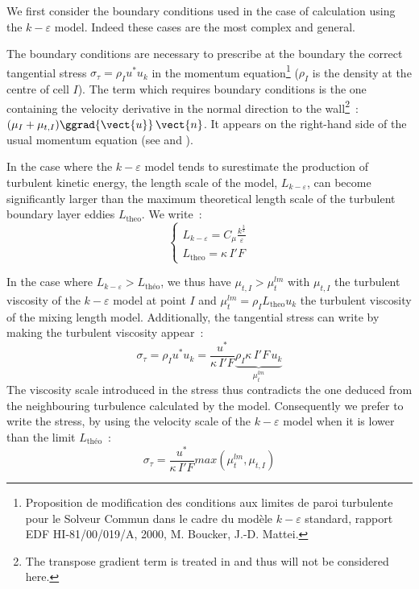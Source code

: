 We first consider the boundary conditions used in the case of calculation using the
 $k-\varepsilon$ model. Indeed these cases are the most complex and general.

The boundary conditions are necessary to prescribe at the boundary
 the correct tangential stress $\sigma_\tau=\rho_Iu^*u_k$ in the momentum 
equation\footnote{Proposition de modification des conditions aux limites de
paroi turbulente pour le Solveur Commun dans le cadre du mod\`ele
$k-\varepsilon$ standard, rapport EDF HI-81/00/019/A, 2000, M. Boucker, J.-D. Mattei.}
($\rho_I$ is the density at the centre of cell $I$). 
The term which requires boundary conditions is the one containing the 
velocity derivative in the normal direction to the wall\footnote{The transpose gradient term is treated in 
and thus will not be considered here.}~:
$(\mu_I+\mu_{t,I})\ggrad{\vect{u}}\,\vect{n}$. It appears on the 
right-hand side of the usual momentum equation (see  and ).

In the case where the  $k-\varepsilon$  model tends to surestimate 
the production of turbulent kinetic energy, the length scale of the model,
$L_{k-\varepsilon}$,
can become significantly larger than the maximum theoretical length scale
of the turbulent boundary layer eddies  $L_{\text{theo}}$. We write~:
\begin{equation}
\left\{\begin{array}{l}
L_{k-\varepsilon} = C_{\mu}\displaystyle\frac{k^\frac{3}{2}}{\varepsilon}\\
L_{\text{theo}} = \kappa\, I'F
\end{array}\right.
\end{equation}

In the case where $L_{k-\varepsilon}>L_{\text{th\'eo}}$, we thus have 
$\mu_{t,I}>\mu_{t}^{lm}$ with $\mu_{t,I}$ the turbulent viscosity of the 
$k-\varepsilon$ model at point $I$ and $\mu_{t}^{lm}=\rho_I L_{\text{theo}}u_k$ 
the turbulent viscosity of the mixing length model. Additionally, the 
tangential stress can write by making the turbulent viscosity appear~:
\begin{equation}
\sigma_\tau = \rho_Iu^*u_k = \displaystyle\frac{u^*}{\kappa\, I'F}\underbrace{\rho_I\kappa\, I'F\, u_k}_{\mu^{lm}_t}
\end{equation}
The viscosity scale introduced in the stress thus contradicts the one deduced 
from the neighbouring turbulence calculated by the model. 
Consequently we prefer to write the stress, by using the velocity scale of the $k-\varepsilon$ model when it is lower than 
the limit $L_{\text{th\'eo}}$~: 
\begin{equation}
\sigma_\tau = \displaystyle\frac{u^*}{\kappa\, I'F} max(\mu_{t}^{lm},\mu_{t,I})
\end{equation}

